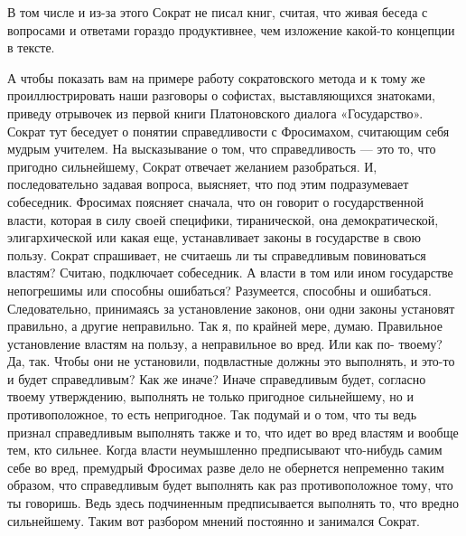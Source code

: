 В том числе и из-за этого Сократ не писал книг,
считая, что живая беседа с вопросами и ответами гораздо продуктивнее, чем
изложение какой-то концепции в тексте. 

А чтобы показать вам на примере работу
сократовского метода и к тому же проиллюстрировать наши разговоры о софистах,
выставляющихся знатоками, приведу отрывочек из первой книги Платоновского
диалога «Государство». Сократ тут беседует о понятии справедливости с
Фросимахом, считающим себя мудрым учителем. На высказывание о том, что
справедливость — это то, что пригодно сильнейшему, Сократ отвечает желанием
разобраться. И, последовательно задавая вопроса, выясняет, что под этим
подразумевает собеседник. Фросимах поясняет сначала, что он говорит о
государственной власти, которая в силу своей специфики, тиранической, она
демократической, элигархической или какая еще, устанавливает законы в
государстве в свою пользу. Сократ спрашивает, не считаешь ли ты справедливым
повиноваться властям? Считаю, подключает собеседник. А власти в том или ином
государстве непогрешимы или способны ошибаться? Разумеется, способны и
ошибаться. Следовательно, принимаясь за установление законов, они одни законы
установят правильно, а другие неправильно. Так я, по крайней мере, думаю.
Правильное установление властям на пользу, а неправильное во вред. Или как по-
твоему? Да, так. Чтобы они не установили, подвластные должны это выполнять, и
это-то и будет справедливым? Как же иначе? Иначе справедливым будет, согласно
твоему утверждению, выполнять не только пригодное сильнейшему, но и
противоположное, то есть непригодное. Так подумай и о том, что ты ведь признал
справедливым выполнять также и то, что идет во вред властям и вообще тем, кто
сильнее. Когда власти неумышленно предписывают что-нибудь самим себе во вред,
премудрый Фросимах разве дело не обернется непременно таким образом, что
справедливым будет выполнять как раз противоположное тому, что ты говоришь. Ведь
здесь подчиненным предписывается выполнять то, что вредно сильнейшему. Таким вот
разбором мнений постоянно и занимался Сократ. 

